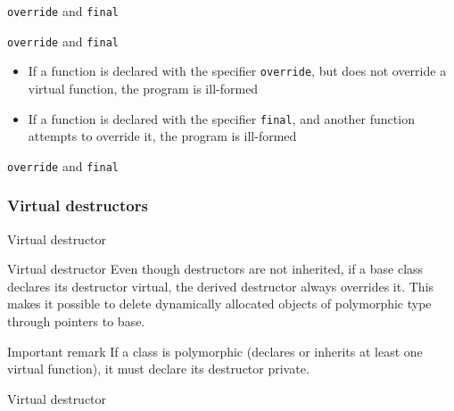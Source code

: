 \begin{frame}{\texttt{override} and \texttt{final}}{}
  \begin{block}{\texttt{override} and \texttt{final}}
    \begin{itemize}
    \item
      If a function is declared with the specifier \lstinline!override!, but does not override a virtual function, the program is ill-formed
    \item
      If a function is declared with the specifier \lstinline!final!, and another function attempts to override it, the program is ill-formed
    \end{itemize}
  \end{block}
\end{frame}

\begin{frame}{\texttt{override} and \texttt{final}}{}
  \begin{example}
  \end{example}
\end{frame}

\subsubsection{Virtual destructors}

\begin{frame}{Virtual destructor}{}
  \begin{block}{Virtual destructor}
    Even though destructors are not inherited, if a base class declares its destructor virtual, the derived destructor always overrides it. This makes it possible to delete dynamically allocated objects of polymorphic type through pointers to base.
  \end{block}
  \begin{block}{Important remark}
    If a class is polymorphic (declares or inherits at least one virtual function), it must declare its destructor private.
  \end{block}
\end{frame}

\begin{frame}{Virtual destructor}{}
  \begin{example}
  \end{example}
\end{frame}

